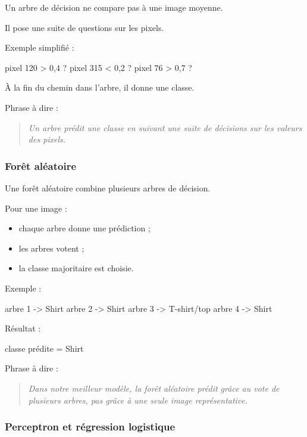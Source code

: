\documentclass[11pt,a4paper]{article}
\begin{document}
Un arbre de décision ne compare pas à une image moyenne.

Il pose une suite de questions sur les pixels.

Exemple simplifié :

\begin{codeblock}
pixel 120 > 0,4 ?
pixel 315 < 0,2 ?
pixel 76 > 0,7 ?
\end{codeblock}

À la fin du chemin dans l'arbre, il donne une classe.

Phrase à dire :

\begin{quote}
\itshape Un arbre prédit une classe en suivant une suite de décisions sur les valeurs des pixels.
\end{quote}

\subsubsection{Forêt aléatoire}

Une forêt aléatoire combine plusieurs arbres de décision.

Pour une image :

\begin{itemize}
\item chaque arbre donne une prédiction ;
\item les arbres votent ;
\item la classe majoritaire est choisie.
\end{itemize}

Exemple :

\begin{codeblock}
arbre 1 -> Shirt
arbre 2 -> Shirt
arbre 3 -> T-shirt/top
arbre 4 -> Shirt
\end{codeblock}

Résultat :

\begin{codeblock}
classe prédite = Shirt
\end{codeblock}

Phrase à dire :

\begin{quote}
\itshape Dans notre meilleur modèle, la forêt aléatoire prédit grâce au vote de plusieurs arbres, pas grâce à une seule image représentative.
\end{quote}

\subsubsection{Perceptron et régression logistique}
\end{document}
